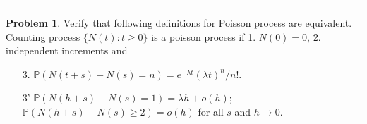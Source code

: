 \documentclass[a4paper, 10pt]{article}
\theoremstyle{definition}
\newtheorem{problem}{Problem}
\theoremstyle{hSol}
\begin{document}
\noindent\rule{16cm}{0.4pt}
\begin{problem} Verify that following definitions for Poisson process are equivalent. Counting process $\{N(t): t\geq 0\}$ is a poisson process if 1. $N(0)=0$, 2. independent increments and
\begin{itemize}
  \item[3.] $\mathbb{P}\left(N(t+s)-N(s)=n\right)=e^{-\lambda t}(\lambda t)^n / n!$.
  \item[3'] $\mathbb{P}\left(N(h+s)-N(s)=1\right)=\lambda h+o(h)$; $\mathbb{P}\left(N(h+s)-N(s)\geq 2\right)=o(h)$ for all $s$ and $h\to 0$.
\end{itemize}
\end{problem}
\end{document}
